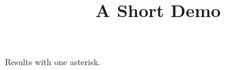 \documentclass[article]{jss}
\title{A Short Demo}
\begin{document}
\begin{table}
Results with one asterisk.
\caption{\label{tab:x} Results. Entries marked with an asterisk are significant at the 5\% level.}
\end{table}
\end{document}
